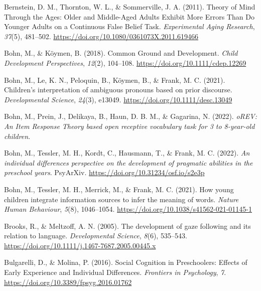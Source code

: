 \documentclass[
  man,floatsintext]{apa7}
\newlength{\cslhangindent}
\newlength{\cslentryspacingunit} %
\newenvironment{CSLReferences}[2] %
 {%
  \setlength{\parindent}{0pt}
  \ifodd #1
  \let\oldpar\par
  \def\par{\hangindent=\cslhangindent\oldpar}
  \fi
  \setlength{\parskip}{#2\cslentryspacingunit}
 }%
 {}
\begin{document}
\begin{CSLReferences}{1}{0}
\leavevmode{}%
Bernstein, D. M., Thornton, W. L., \& Sommerville, J. A. (2011). Theory of {Mind Through} the {Ages}: {Older} and {Middle-Aged Adults Exhibit More Errors Than Do Younger Adults} on a {Continuous False Belief Task}. \emph{Experimental Aging Research}, \emph{37}(5), 481--502. \url{https://doi.org/10.1080/0361073X.2011.619466}

\leavevmode{}%
Bohn, M., \& Köymen, B. (2018). Common {Ground} and {Development}. \emph{Child Development Perspectives}, \emph{12}(2), 104--108. \url{https://doi.org/10.1111/cdep.12269}

\leavevmode{}%
Bohn, M., Le, K. N., Peloquin, B., Köymen, B., \& Frank, M. C. (2021). Children's interpretation of ambiguous pronouns based on prior discourse. \emph{Developmental Science}, \emph{24}(3), e13049. \url{https://doi.org/10.1111/desc.13049}

\leavevmode{}%
Bohn, M., Prein, J., Delikaya, B., Haun, D. B. M., \& Gagarina, N. (2022). \emph{{oREV}: An {Item Response Theory} based open receptive vocabulary task for 3 to 8-year-old children}.

\leavevmode{}%
Bohn, M., Tessler, M. H., Kordt, C., Hausmann, T., \& Frank, M. C. (2022). \emph{An individual differences perspective on the development of pragmatic abilities in the preschool years}. {PsyArXiv}. \url{https://doi.org/10.31234/osf.io/s2e3p}

\leavevmode{}%
Bohn, M., Tessler, M. H., Merrick, M., \& Frank, M. C. (2021). How young children integrate information sources to infer the meaning of words. \emph{Nature Human Behaviour}, \emph{5}(8), 1046--1054. \url{https://doi.org/10.1038/s41562-021-01145-1}

\leavevmode{}%
Brooks, R., \& Meltzoff, A. N. (2005). The development of gaze following and its relation to language. \emph{Developmental Science}, \emph{8}(6), 535--543. \url{https://doi.org/10.1111/j.1467-7687.2005.00445.x}

\leavevmode{}%
Bulgarelli, D., \& Molina, P. (2016). Social {Cognition} in {Preschoolers}: {Effects} of {Early Experience} and {Individual Differences}. \emph{Frontiers in Psychology}, \emph{7}. \url{https://doi.org/10.3389/fpsyg.2016.01762}


\end{CSLReferences}
\end{document}
